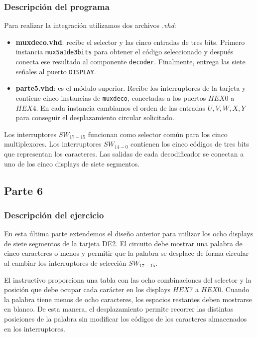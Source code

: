 \documentclass[12pt]{report}
\begin{document}
\subsubsection*{Descripción del programa}
Para realizar la integración utilizamos dos archivos \textit{.vhd}:

\begin{itemize}
    \item \textbf{muxdeco.vhd}: recibe el selector y las cinco entradas de tres bits. Primero instancia \texttt{mux5a1de3bits} para obtener el código seleccionado y después conecta ese resultado al componente \texttt{decoder}. Finalmente, entrega las siete señales al puerto \texttt{DISPLAY}.
    \item \textbf{parte5.vhd}: es el módulo superior. Recibe los interruptores de la tarjeta y contiene cinco instancias de \texttt{muxdeco}, conectadas a los puertos $HEX0$ a $HEX4$. En cada instancia cambiamos el orden de las entradas $U,V,W,X,Y$ para conseguir el desplazamiento circular solicitado.
\end{itemize}

Los interruptores $SW_{17-15}$ funcionan como selector común para los cinco multiplexores. Los interruptores $SW_{14-0}$ contienen los cinco códigos de tres bits que representan los caracteres. Las salidas de cada decodificador se conectan a uno de los cinco displays de siete segmentos.

\subsection*{Parte 6}
\subsubsection*{Descripción del ejercicio}
En esta última parte extendemos el diseño anterior para utilizar los ocho displays de siete segmentos de la tarjeta DE2. El circuito debe mostrar una palabra de cinco caracteres o menos y permitir que la palabra se desplace de forma circular al cambiar los interruptores de selección $SW_{17-15}$.

El instructivo proporciona una tabla con las ocho combinaciones del selector y la posición que debe ocupar cada carácter en los displays $HEX7$ a $HEX0$. Cuando la palabra tiene menos de ocho caracteres, los espacios restantes deben mostrarse en blanco. De esta manera, el desplazamiento permite recorrer las distintas posiciones de la palabra sin modificar los códigos de los caracteres almacenados en los interruptores.
\end{document}
